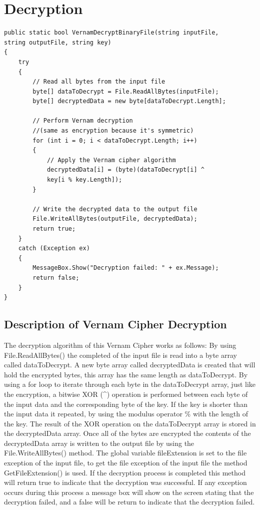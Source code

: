 \documentclass[a4paper,oneside,11pt]{book}
\begin{document}
\section{Decryption}
\begin{lstlisting}[language=Csh, caption={Code for Vernam Cipher Decryption}]
public static bool VernamDecryptBinaryFile(string inputFile, 
string outputFile, string key)
{
    try
    {
        // Read all bytes from the input file
        byte[] dataToDecrypt = File.ReadAllBytes(inputFile);
        byte[] decryptedData = new byte[dataToDecrypt.Length];
    
        // Perform Vernam decryption
        //(same as encryption because it's symmetric)
        for (int i = 0; i < dataToDecrypt.Length; i++)
        {
            // Apply the Vernam cipher algorithm
            decryptedData[i] = (byte)(dataToDecrypt[i] ^ 
            key[i % key.Length]);
        }
    
        // Write the decrypted data to the output file
        File.WriteAllBytes(outputFile, decryptedData);
        return true;
    }
    catch (Exception ex)
    {
        MessageBox.Show("Decryption failed: " + ex.Message);
        return false;
    }
}
\end{lstlisting}

\subsection{Description of Vernam Cipher Decryption}

The decryption algorithm of this Vernam Cipher works as follows:
By using File.ReadAllBytes() the completed of the input file is read into a byte array called dataToDecrypt. A new byte array called decryptedData is created that will hold the encrypted bytes, this array has the same length as dataToDecrypt. By using a for loop to iterate through each byte in the dataToDecrypt array, just like the encryption, a bitwise XOR (\^{}) operation is performed between each byte of the input data and the corresponding byte of the key. If the key is shorter than the input data it repeated, by using the modulus operator \% with the length of the key. The result of the XOR operation on the  dataToDecrypt array is stored in the decryptedData array. Once all of the bytes are encrypted the contents of the decryptedData array is written to the output file by using the File.WriteAllBytes() method. The global variable fileExtension is set to the file exception of the input file, to get the file exception of the input file the method GetFileExtension() is used. If the decryption process is completed this method will return true to indicate that the decryption was successful. If any exception occurs during this process a message box will show on the screen stating that the decryption failed, and a false will be return to indicate that the decryption failed.
\end{document}
